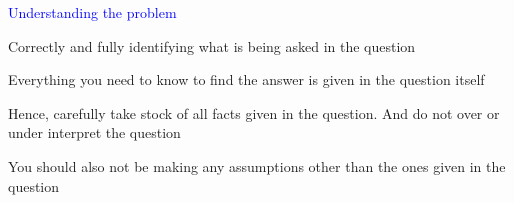 \documentclass[14pt,fleqn]{extarticle}
\begin{document}
\begin{skill}
\textcolor{blue}{Understanding the problem}

Correctly and fully identifying what
is being asked in the question
\end{skill}

\newcard 

Everything you need to know to find the answer is given in the question itself\newline 

Hence, carefully take stock of all facts given in the question. 
And do not over or under interpret the question \newline 

You should also not be making any assumptions other than the 
ones given in the question
\end{document}
